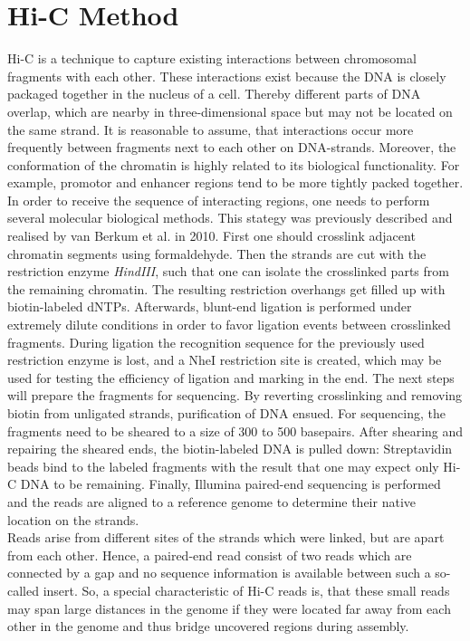 \section{Hi-C Method}
\label{section:Hi-C}
Hi-C is a technique to capture existing interactions between chromosomal fragments with each other. These interactions exist because the \ac{DNA} is closely packaged together in the nucleus of a cell. Thereby different parts of \ac{DNA} overlap, which are nearby in three-dimensional space but may not be located on the same strand. It is reasonable to assume, that interactions occur more frequently between fragments next to each other on \ac{DNA}-strands. Moreover, the conformation of the chromatin is highly related to its biological functionality. For example, promotor and enhancer regions tend to be more tightly packed together. \cite{Belton}\\
In order to receive the sequence of interacting regions, one needs to perform several molecular biological methods. This stategy was previously described and realised by van Berkum et al. in 2010. First one should crosslink adjacent chromatin segments using formaldehyde. Then the strands are cut with the restriction enzyme \textit{HindIII}, such that one can isolate the crosslinked parts from the remaining chromatin. The resulting restriction overhangs get filled up with biotin-labeled \acp{dNTP}. Afterwards, blunt-end ligation is performed under extremely dilute conditions in order to favor ligation events between crosslinked fragments. During ligation the recognition sequence for the previously used restriction enzyme is lost, and a NheI restriction site is created, which may be used for testing the efficiency of ligation and marking in the end. The next steps will prepare the fragments for sequencing. By reverting crosslinking and removing biotin from unligated strands, purification of \ac{DNA} ensued. For sequencing, the fragments need to be sheared to a size of 300 to 500 basepairs. After shearing and repairing the sheared ends, the biotin-labeled \ac{DNA} is pulled down: Streptavidin beads bind to the labeled fragments with the result that one may expect only Hi-C \ac{DNA} to be remaining. Finally, Illumina paired-end sequencing is performed and the reads are aligned to a reference genome to determine their native location on the strands. \cite{Berkum}\\
Reads arise from different sites of the strands which were linked, but are apart from each other. Hence, a paired-end read consist of two reads which are connected by a gap and no sequence information is available between such a so-called insert. So, a special characteristic of Hi-C reads is, that these small reads may span large distances in the genome if they were located far away from each other in the genome and thus bridge uncovered regions during assembly. \cite{HapCut2}

